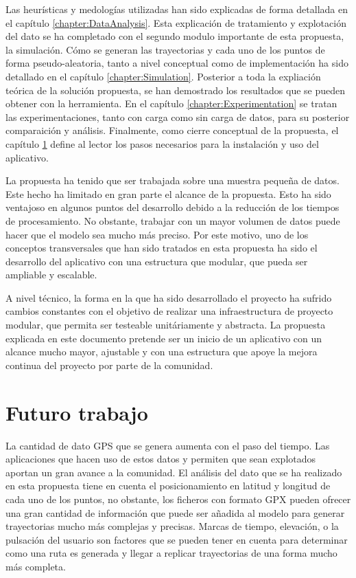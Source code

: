 Las heurísticas y medologías utilizadas han sido explicadas de forma detallada en el capítulo \ref{chapter:DataAnalysis}. Esta explicación de tratamiento y explotación del dato se ha completado con el segundo modulo importante de esta propuesta, la simulación. Cómo se generan las trayectorias y cada uno de los puntos de forma pseudo-aleatoria, tanto a nivel conceptual como de implementación ha sido detallado en el capítulo \ref{chapter:Simulation}. 
Posterior a toda la expliación teórica de la solución propuesta, se han demostrado los resultados que se pueden obtener con la herramienta. En el capítulo \ref{chapter:Experimentation} se tratan las experimentaciones, tanto con carga como sin carga de datos, para su posterior comparaición y análisis. Finalmente, como cierre conceptual de la propuesta, el capítulo \ref{} define al lector los pasos necesarios para la instalación y uso del aplicativo.

La propuesta ha tenido que ser trabajada sobre una muestra pequeña de datos. Este hecho ha limitado en gran parte el alcance de la propuesta. Esto ha sido ventajoso en algunos puntos del desarrollo debido a la reducción de los tiempos de procesamiento. No obstante, trabajar con un mayor volumen de datos puede hacer que el modelo sea mucho más preciso. Por este motivo, uno de los conceptos transversales que han sido tratados en esta propuesta ha sido el desarrollo del aplicativo con una estructura que modular, que pueda ser ampliable y escalable.

A nivel técnico, la forma en la que ha sido desarrollado el proyecto ha sufrido cambios constantes con el objetivo de realizar una infraestructura de proyecto modular, que permita ser testeable unitáriamente y abstracta. La propuesta explicada en este documento pretende ser un inicio de un aplicativo con un alcance mucho mayor, ajustable y con una estructura que apoye la mejora continua del proyecto por parte de la comunidad.

\section{Futuro trabajo}
La cantidad de dato \ac{GPS} que se genera aumenta con el paso del tiempo. Las aplicaciones que hacen uso de estos datos y permiten que sean explotados aportan un gran avance a la comunidad. El análisis del dato que se ha realizado en esta propuesta tiene en cuenta el posicionamiento en latitud y longitud de cada uno de los puntos, no obstante, los ficheros con formato \ac{GPX} pueden ofrecer una gran cantidad de información que puede ser añadida al modelo para generar trayectorias mucho más complejas y precisas. Marcas de tiempo, elevación, o la pulsación del usuario son factores que se pueden tener en cuenta para determinar como una ruta es generada y llegar a replicar trayectorias de una forma mucho más completa.

